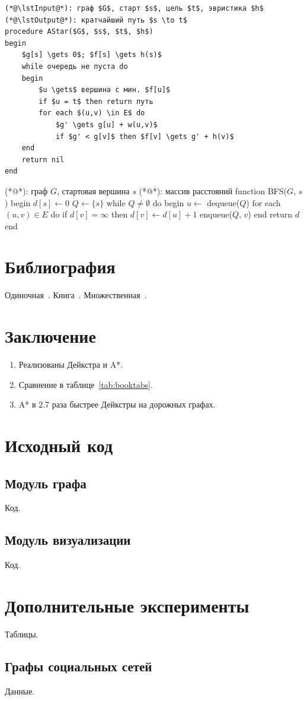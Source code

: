 \documentclass[font=modern]{cmcmsuthesis-master}
\begin{document}
\begin{lstlisting}[style=pseudocode,caption={Псевдокод A*}]
(*@\lstInput@*): граф $G$, старт $s$, цель $t$, эвристика $h$
(*@\lstOutput@*): кратчайший путь $s \to t$
procedure AStar($G$, $s$, $t$, $h$)
begin
    $g[s] \gets 0$; $f[s] \gets h(s)$
    while очередь не пуста do
    begin
        $u \gets$ вершина с мин. $f[u]$
        if $u = t$ then return путь
        for each $(u,v) \in E$ do
            $g' \gets g[u] + w(u,v)$
            if $g' < g[v]$ then $f[v] \gets g' + h(v)$
    end
    return nil
end
\end{lstlisting}

\begin{lstpseudocode}[caption={BFS},label={alg:bfs}]
(*@\lstInput@*): граф $G$, стартовая вершина $s$
(*@\lstOutput@*): массив расстояний
function BFS($G$, $s$)
begin
    $d[s] \gets 0$
    $Q \gets \{s\}$
    while $Q \neq \emptyset$ do
    begin
        $u \gets$ dequeue($Q$)
        for each $(u,v) \in E$ do
            if $d[v] = \infty$ then
                $d[v] \gets d[u] + 1$
                enqueue($Q$, $v$)
    end
    return $d$
end
\end{lstpseudocode}

\section{Библиография}
Одиночная~\cite{shannon1948}. Книга~\cite{knuth1984}.
Множественная~\cite{shannon1948,knuth1984,macwilliams1979}.

\section*{Заключение}
\begin{enumerate}
\item Реализованы Дейкстра и A*.
\item Сравнение в таблице~\ref{tab:booktabs}.
\item A* в 2.7 раза быстрее Дейкстры на дорожных графах.
\end{enumerate}

\clearpage\listoftables{}
\printbibliography

\appendix
\section{Исходный код}
\subsection{Модуль графа}
Код.
\subsection{Модуль визуализации}
Код.

\section{Дополнительные эксперименты}
Таблицы.
\subsection{Графы социальных сетей}
Данные.
\end{document}
